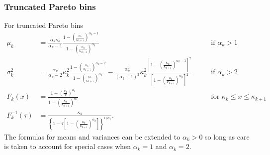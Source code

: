 \documentclass[12pt]{article}
\begin{document}
\subsubsection{Truncated Pareto bins}
For truncated Pareto bins
\begin{align*}
  \mu_k & = \frac{\alpha_k\kappa_k}{\alpha_k - 1}\frac{1 - \left(\frac{\kappa_k}{\kappa_{k+1}}\right)^{\alpha_k - 1}}{1 - \left(\frac{\kappa_k}{\kappa_{k+1}}\right)^{\alpha_k}} &&& \mbox{ if } \alpha_k > 1\\
  \sigma_k^2 &= \frac{\alpha_k}{\alpha_k - 2}\kappa_k^2\frac{1 - \left(\frac{\kappa_k}{\kappa_{k+1}}\right)^{\alpha_k - 2}}{1 - \left(\frac{\kappa_k}{\kappa_{k+1}}\right)^{\alpha_k}} - \frac{\alpha_k^2}{(\alpha_k-1)^2}\kappa_k^2\frac{\left[1 - \left(\frac{\kappa_k}{\kappa_{k+1}}\right)^{\alpha_k - 1}\right]^2}{\left[1 - \left(\frac{\kappa_k}{\kappa_{k+1}}\right)^{\alpha_k }\right]^2} &&& \mbox{ if } \alpha_k > 2\\
  F_k(x) &= \frac{1 - \left(\frac{\kappa_k}{x}\right)^{\alpha_k}}{1 - \left(\frac{\kappa_k}{\kappa_{k+1}}\right)^{\alpha_k}} &&& \mbox{ for } \kappa_k \leq x \leq \kappa_{k+1} \\
  F^{-1}_k(\tau) & = \frac{\kappa_k}{\left\{1 - \tau\left[1 - \left(\frac{\kappa_k}{\kappa_{k+1}}\right)^{\alpha_k}\right]\right\}^{1/\alpha_k}}. &&&
\end{align*}
The formulas for means and variances can be extended to $\alpha_k > 0$ so long as care is taken to account for special cases when $\alpha_k = 1$ and $\alpha_k = 2$.
\end{document}
